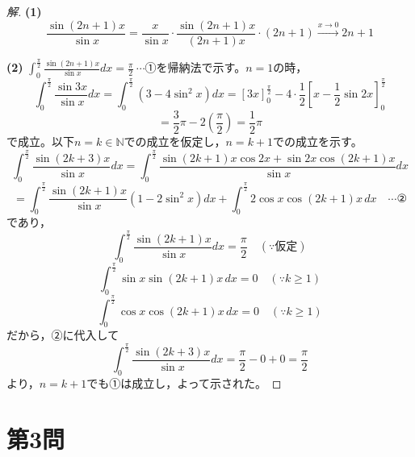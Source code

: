 \documentclass[../main.tex]{subfiles}
\begin{document}
\begin{proof}[解]
  \textbf{(1)}
  \[
    \frac{\sin(2n+1)x}{\sin x}=\frac{x}{\sin x}\cdot\frac{\sin(2n+1)x}{(2n+1)x}\cdot(2n+1)\xrightarrow{x\to0}2n+1
  \]

  \textbf{(2)} $\displaystyle\int_0^{\frac{\pi}{2}}\frac{\sin(2n+1)x}{\sin x}dx=\frac{\pi}{2}\ \cdots$①を帰納法で示す。$n=1$の時，
  \[
    \int_0^{\frac{\pi}{2}}\frac{\sin3x}{\sin x}dx=\int_0^{\frac{\pi}{2}}(3-4\sin^2x)dx=\left[3x\right]_0^{\frac{\pi}{2}}-4\cdot\frac12\left[x-\frac12\sin2x\right]_0^{\frac{\pi}{2}}
  \]
  \[
    =\frac32\pi-2\left(\frac{\pi}{2}\right)=\frac12\pi
  \]
  で成立。以下$n=k\in\mathbb{N}$での成立を仮定し，$n=k+1$での成立を示す。
  \[
    \int_0^{\frac{\pi}{2}}\frac{\sin(2k+3)x}{\sin x}dx=\int_0^{\frac{\pi}{2}}\frac{\sin(2k+1)x\cos2x+\sin2x\cos(2k+1)x}{\sin x}dx
  \]
  \[
    =\int_0^{\frac{\pi}{2}}\frac{\sin(2k+1)x}{\sin x}(1-2\sin^2x)dx+\int_0^{\frac{\pi}{2}}2\cos x\cos(2k+1)x\,dx \quad\cdots\text{②}
  \]
  であり，
  \[
    \int_0^{\frac{\pi}{2}}\frac{\sin(2k+1)x}{\sin x}dx=\frac{\pi}{2} \quad(\because\text{仮定})
  \]
  \[
    \int_0^{\frac{\pi}{2}}\sin x\sin(2k+1)x\,dx=0 \quad(\because k\ge1)
  \]
  \[
    \int_0^{\frac{\pi}{2}}\cos x\cos(2k+1)x\,dx=0 \quad(\because k\ge1)
  \]
  だから，②に代入して
  \[
    \int_0^{\frac{\pi}{2}}\frac{\sin(2k+3)x}{\sin x}dx=\frac{\pi}{2}-0+0=\frac{\pi}{2}
  \]
  より，$n=k+1$でも①は成立し，よって示された。
\end{proof}

\newpage

\section*{第3問}
\end{document}
